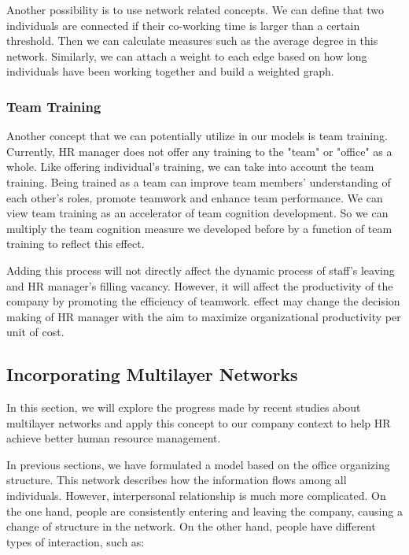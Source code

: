 \documentclass[tcn = 37075, sheet = false, abstract = false]{mcmthesis}
\begin{document}
Another possibility is to use network related concepts. We can define that two individuals are connected if their co-working time is larger than a certain threshold. Then we can calculate measures such as the average degree in this network. Similarly, we can attach a weight to each edge based on how long individuals have been working together and build a weighted graph.
 
\subsubsection{Team Training}

Another concept that we can potentially utilize in our models is team training. Currently, HR manager does not offer any training to the "team" or "office" as a whole. Like offering individual's training, we can take into account the team training. Being trained as a team can improve team members' understanding of each other's roles, promote teamwork and enhance team performance\cite{cooke2004advances}. We can view team training as an accelerator of team cognition development. So we can multiply the team cognition measure we developed before by a function of team training to reflect this effect. 

Adding this process will not directly affect the dynamic process of staff's leaving and HR manager's filling vacancy. However, it will affect the productivity of the company by promoting the efficiency of teamwork.  effect may change the decision making of HR manager with the aim to maximize organizational productivity per unit of cost. 

\subsection{Incorporating Multilayer Networks }

In this section, we will explore the progress made by recent studies about multilayer networks\cite{kivela2014multilayer} and apply this concept to our company context to help HR achieve better human resource management.

In previous sections, we have formulated a model based on the office organizing structure. This network describes how the information flows among all individuals. However,  interpersonal relationship is much more complicated. On the one hand, people are consistently entering and leaving the company, causing a change of structure in the network. On the other hand, people have different types of interaction, such as:
\end{document}
